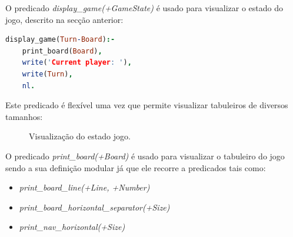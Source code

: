 \documentclass[a4paper,11pt,portuguese]{article}
\begin{document}
    \noindent O predicado \textit{display\_game(+GameState) } é usado para visualizar
    o estado do jogo, descrito na secção anterior:

\begin{lstlisting}[language=prolog]
% display_game(+GameState)
display_game(Turn-Board):-
    print_board(Board),
    write('Current player: '),
    write(Turn),
    nl.
\end{lstlisting}

    \noindent Este predicado é flexível uma vez que permite visualizar tabuleiros
    de diversos tamanhos:

    \begin{figure}[H]
        \centering
        \qquad
        \caption{Visualização do estado jogo.}
        \label{fig:board_view}
    \end{figure}
    
    \noindent O predicado \textit{print\_board(+Board) } é usado para visualizar
    o tabuleiro do jogo sendo a sua definição modular já que ele recorre a predicados
    tais como:

    \begin{itemize}[topsep=4pt,itemsep=2pt]
        \item \textit{print\_board\_line(+Line, +Number) }
        \item \textit{print\_board\_horizontal\_separator(+Size) }
        \item \textit{print\_nav\_horizontal(+Size) }
    \end{itemize}
\end{document}
